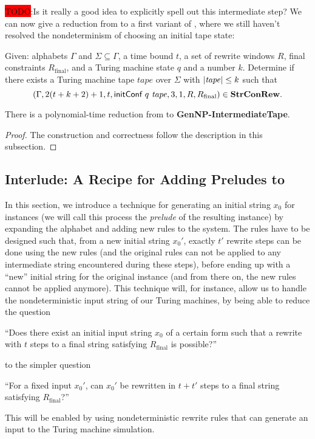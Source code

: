 \documentclass[a4paper,UKenglish,cleveref, autoref]{lipics-v2019}
\newcommand{\TODO}[1]{\colorbox{red}{\LARGE TODO}:#1}
\newcommand{\Rfinal}{R_{\text{final}}}
\begin{document}
\TODO{Is it really a good idea to explicitly spell out this intermediate step?}
We can now give a reduction from \gennp{} to a first variant of \strconrew{}, where we still haven't resolved the nondeterminism of choosing an initial tape state:
\begin{definition}
  Given: alphabets $\Gamma$ and $\Sigma \subseteq \Gamma$, a time bound $t$, a set of rewrite windows $R$, final constraints $\Rfinal$, and a Turing machine state $q$ and a number $k$. 
  Determine if there exists a Turing machine tape $\mathit{tape}$ over $\Sigma$ with $|\mathit{tape}| \le k$ such that 
  \[(\Gamma, 2 (t + k + 2) + 1, t, \textsf{initConf}~q~\mathit{tape}, 3, 1, R, \Rfinal) \in \strconrew{}.\]
\end{definition}
\begin{theorem}
  There is a polynomial-time reduction from \gennp{} to \textbf{GenNP-IntermediateTape}. 
\end{theorem}
\begin{proof}
  The construction and correctness follow the description in this subsection. 
\end{proof}


\subsection{Interlude: A Recipe for Adding Preludes to \strconrew{}}
In this section, we introduce a technique for generating an initial string $x_0$ for \strconrew{} instances (we will call this process the \emph{prelude} of the resulting \strconrew{} instance) by expanding the alphabet and adding new rules to the system. The rules have to be designed such that, from a new initial string $x_0'$, exactly $t'$ rewrite steps can be done using the new rules (and the original rules can not be applied to any intermediate string encountered during these steps), before ending up with a ``new'' initial string for the original \strconrew{} instance (and from there on, the new rules cannot be applied anymore). 
This technique will, for instance, allow us to handle the nondeterministic input string of our Turing machines, by being able to reduce the question
\begin{center}
  ``Does there exist an initial input string $x_0$ of a certain form such that a rewrite with $t$ steps to a final string satisfying $\Rfinal$ is possible?''
\end{center}
to the simpler question
\begin{center}
  ``For a fixed input $x_0'$, can $x_0'$ be rewritten in $t + t'$ steps to a final string satisfying $\Rfinal$?''
\end{center}
This will be enabled by using nondeterministic rewrite rules that can generate an input to the Turing machine simulation.
\end{document}
